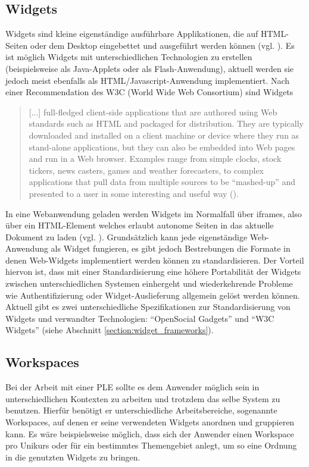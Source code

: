 \subsection{Widgets}\label{section:widgets}
Widgets sind kleine eigenständige ausführbare Applikationen, die auf HTML-Seiten oder dem Desktop eingebettet und ausgeführt werden können (vgl. \cite{Taraghi2010}). Es ist möglich Widgets mit unterschiedlichen Technologien zu erstellen (beispielsweise als Java-Applets oder als Flash-Anwendung), aktuell werden sie jedoch meist ebenfalls als HTML/Javascript-Anwendung implementiert. Nach einer Recommendation des W3C (World Wide Web Consortium) sind Widgets
\begin{quotation}[...] full-fledged client-side applications that are authored using Web standards such as HTML and packaged for distribution. They are typically downloaded and installed on a client machine or device where they run as stand-alone applications, but they can also be embedded into Web pages and run in a Web browser. Examples range from simple clocks, stock tickers, news casters, games and weather forecasters, to complex applications that pull data from multiple sources to be "`mashed-up"' and presented to a user in some interesting and useful way (\cite{W3C-11-2012}).\end{quotation}
In eine Webanwendung geladen werden Widgets im Normalfall über iframes, also über ein HTML-Element welches erlaubt autonome Seiten in das aktuelle Dokument zu laden (vgl. \cite{W3C1999}). Grundsätzlich kann jede eigenständige Web-Anwendung als Widget fungieren, es gibt jedoch Bestrebungen die Formate in denen Web-Widgets implementiert werden können zu standardisieren. Der Vorteil hiervon ist, dass mit einer Standardisierung eine höhere Portabilität der Widgets zwischen unterschiedlichen Systemen einhergeht und wiederkehrende Probleme wie Authentifizierung oder Widget-Auslieferung allgemein gelöst werden können. Aktuell gibt es zwei unterschiedliche Spezifikationen zur Standardisierung von Widgets und verwandter Technologien: "`OpenSocial Gadgets"' und "`W3C Widgets"' (siehe Abschnitt \ref{section:widget_frameworks}).

\subsection{Workspaces}
Bei der Arbeit mit einer PLE sollte es dem Anwender möglich sein in unterschiedlichen Kontexten zu arbeiten und trotzdem das selbe System zu benutzen. Hierfür benötigt er unterschiedliche Arbeitsbereiche, sogenannte Workspaces, auf denen er seine verwendeten Widgets anordnen und gruppieren kann. Es wäre beispielsweise möglich, dass sich der Anwender einen Workspace pro Unikurs oder für ein bestimmtes Themengebiet anlegt, um so eine Ordnung in die genutzten Widgets zu bringen. 